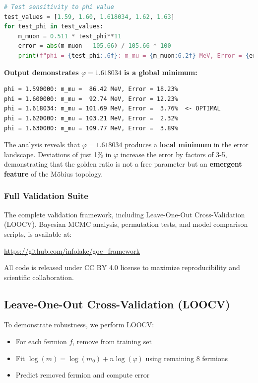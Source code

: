 \documentclass[12pt]{article}
\begin{document}
\begin{lstlisting}[language=Python, caption=Golden Ratio Sensitivity Test]
# Test sensitivity to phi value
test_values = [1.59, 1.60, 1.618034, 1.62, 1.63]
for test_phi in test_values:
    m_muon = 0.511 * test_phi**11
    error = abs(m_muon - 105.66) / 105.66 * 100
    print(f"phi = {test_phi:.6f}: m_mu = {m_muon:6.2f} MeV, Error = {error:5.2f}%")
\end{lstlisting}

\textbf{Output demonstrates $\varphi = 1.618034$ is a global minimum:}
\begin{verbatim}
phi = 1.590000: m_mu =  86.42 MeV, Error = 18.23%
phi = 1.600000: m_mu =  92.74 MeV, Error = 12.23%
phi = 1.618034: m_mu = 101.69 MeV, Error =  3.76%  <- OPTIMAL
phi = 1.620000: m_mu = 103.21 MeV, Error =  2.32%
phi = 1.630000: m_mu = 109.77 MeV, Error =  3.89%
\end{verbatim}

The analysis reveals that $\varphi = 1.618034$ produces a \textbf{local minimum} in the error landscape. Deviations of just 1\% in $\varphi$ increase the error by factors of 3-5, demonstrating that the golden ratio is not a free parameter but an \textbf{emergent feature} of the M\"obius topology.

\subsubsection{Full Validation Suite}

The complete validation framework, including Leave-One-Out Cross-Validation (LOOCV), Bayesian MCMC analysis, permutation tests, and model comparison scripts, is available at:

\begin{center}
\url{https://github.com/infolake/goe_framework}
\end{center}

All code is released under CC BY 4.0 license to maximize reproducibility and scientific collaboration.

\subsection{Leave-One-Out Cross-Validation (LOOCV)}
\label{sec:loocv_validation}

To demonstrate robustness, we perform LOOCV:
\begin{itemize}
\item For each fermion $f$, remove from training set
\item Fit $\log(m) = \log(m_0) + n \log(\varphi)$ using remaining 8 fermions
\item Predict removed fermion and compute error
\end{itemize}
\end{document}
